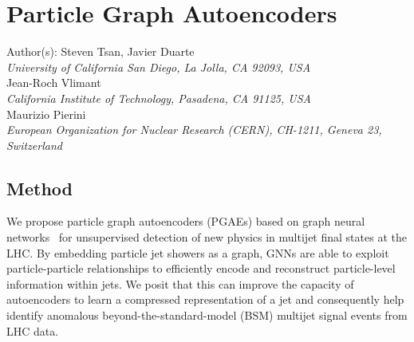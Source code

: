 \documentclass[letterpaper,11pt]{article}
\begin{document}
\section*{Particle Graph Autoencoders}
Author(s): Steven Tsan, Javier Duarte \\ 
\textit{University of California San Diego, La Jolla, CA 92093, USA}\\
Jean-Roch Vlimant\\
\textit{California Institute of Technology, Pasadena, CA 91125, USA}\\
Maurizio Pierini\\
\textit{European Organization for Nuclear Research (CERN), CH-1211, Geneva 23, Switzerland}


\subsection{Method}
\label{sec:method}


We propose particle graph autoencoders (PGAEs) based on graph neural networks~\cite{Shlomi:2020gdn} for unsupervised detection of new physics in multijet final states at the LHC. 
By embedding particle jet showers as a graph, GNNs are able to exploit particle-particle relationships to efficiently encode and reconstruct particle-level information within jets.
We posit that this can improve the capacity of autoencoders to learn a compressed representation of a jet and consequently help identify anomalous beyond-the-standard-model (BSM) multijet signal events from LHC data.
\end{document}
